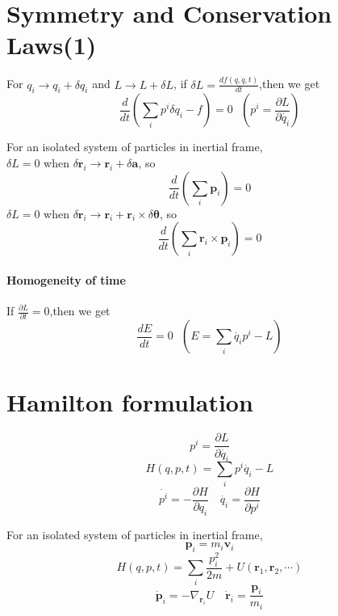 \section{Symmetry and Conservation Laws(1)}
\begin{newthem}
For $q_i \to q_i+\delta q_i$ and $L \to L+\delta L$, if $\delta L= \frac{d f(q,\dot{q},t)}{dt}$,then we get
\[\frac{d}{dt}(\sum_i p^i \delta q_i-f)=0 \ \ \ (p^i=\frac{\partial L}{\partial \dot{q_i}})\]
\end{newthem}
\begin{example}
For an isolated system of particles in inertial frame,\\ 
$\delta L = 0$ when $\delta \bm{r}_i \rightarrow \bm{r}_i + \delta \bm{a}$, so
\[\frac{d}{dt} (\sum_i \bm{p}_i) = 0\]
$\delta L = 0$ when $\delta \bm{r}_i \rightarrow \bm{r}_i + \bm{r}_i \times \delta \bm{\theta}$, so
\[\frac{d}{dt} (\sum_i \bm{r}_i \times \bm{p}_i) = 0\]
\end{example}

\paragraph{Homogeneity of time}
If $\frac{\partial L}{\partial t}=0$,then we get
\[\frac{dE}{dt}=0 \ \ \ (E=\sum_i \dot{q_i}p^i-L)\]

\section{Hamilton formulation}
\[p^i = \frac{\partial L}{\partial \dot{q_i}}\]
\[H(q,p,t)=\sum_i p^i \dot{q_i}-L\]
\[\dot{p^i}=-\frac{\partial H}{\partial q_i} \quad \dot{q_i}=\frac{\partial H}{\partial p^i}\]
\begin{example}
 For an isolated system of particles in inertial frame, 
\[\bm{p}_i = m_i \bm{v}_i\]
\[H(q,p,t)=\sum_i \frac{p_i^2}{2m} + U(\bm{r}_1,\bm{r}_2,\cdots)\]
\[\dot{\bm{p}}_i =-\nabla_{\bm{r}_i} U \quad \dot{\bm{r}}_i = \frac{\bm{p}_i}{m_i}\]
\end{example}
 

